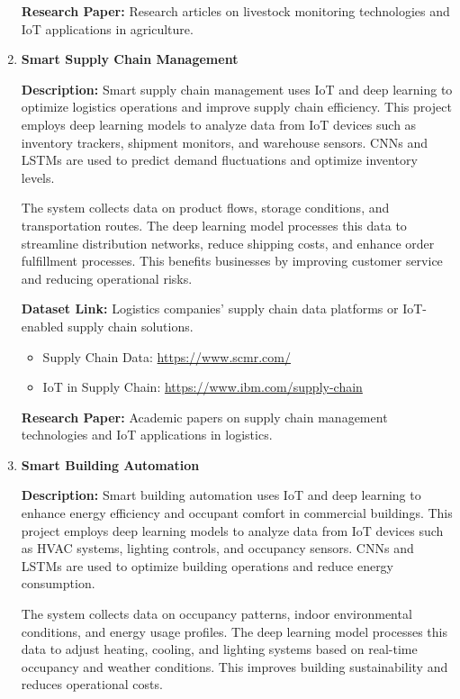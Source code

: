 \documentclass{article}
\begin{document}
\begin{enumerate}[label=\textbf{\arabic*.}, leftmargin=*]
\textbf{Research Paper:} Research articles on livestock monitoring technologies and IoT applications in agriculture.

\item \textbf{Smart Supply Chain Management}

\textbf{Description:}
Smart supply chain management uses IoT and deep learning to optimize logistics operations and improve supply chain efficiency. This project employs deep learning models to analyze data from IoT devices such as inventory trackers, shipment monitors, and warehouse sensors. CNNs and LSTMs are used to predict demand fluctuations and optimize inventory levels.

The system collects data on product flows, storage conditions, and transportation routes. The deep learning model processes this data to streamline distribution networks, reduce shipping costs, and enhance order fulfillment processes. This benefits businesses by improving customer service and reducing operational risks.

\textbf{Dataset Link:} Logistics companies' supply chain data platforms or IoT-enabled supply chain solutions.
\begin{itemize}
    \item Supply Chain Data: \url{https://www.scmr.com/}
    \item IoT in Supply Chain: \url{https://www.ibm.com/supply-chain}
\end{itemize}

\textbf{Research Paper:} Academic papers on supply chain management technologies and IoT applications in logistics.

\item \textbf{Smart Building Automation}

\textbf{Description:}
Smart building automation uses IoT and deep learning to enhance energy efficiency and occupant comfort in commercial buildings. This project employs deep learning models to analyze data from IoT devices such as HVAC systems, lighting controls, and occupancy sensors. CNNs and LSTMs are used to optimize building operations and reduce energy consumption.

The system collects data on occupancy patterns, indoor environmental conditions, and energy usage profiles. The deep learning model processes this data to adjust heating, cooling, and lighting systems based on real-time occupancy and weather conditions. This improves building sustainability and reduces operational costs.


\end{enumerate}
\end{document}
